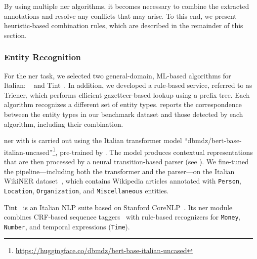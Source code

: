
By using multiple \ac{ner} algorithms, it becomes necessary to combine the extracted annotations and resolve any conflicts that may arise. To this end, we present heuristic-based combination rules, which are described in the remainder of this section. 







\subsubsection{Entity Recognition}          
For the \ac{ner} task, we selected two general-domain, ML-based algorithms for Italian: \spacy~\cite{honnibal2020spacy} and Tint~\cite{2018tint2}. 
In addition, we developed a rule-based service, referred to as Trie\ac{ner}, which performs efficient gazetteer-based lookup using a prefix tree.  
Each algorithm recognizes a different set of entity types.  reports the correspondence between the entity types in our benchmark dataset and those detected by each algorithm, including their combination.  

\ac{ner} with \spacy is carried out using the Italian transformer model ``dbmdz/bert-base-italian-uncased''\footnote{\url{https://huggingface.co/dbmdz/bert-base-italian-uncased}}, pre-trained by \textcite{stefan_schweter_2020_4263142}.  
The model produces contextual representations that are then processed by a neural transition-based parser (see ).  
We fine-tuned the \spacy pipeline---including both the transformer and the parser---on the Italian WikiNER dataset~\cite{NOTHMAN2013151}, which contains Wikipedia articles annotated with \texttt{Person}, \texttt{Location}, \texttt{Organization}, and \texttt{Miscellaneous} entities.

Tint~\cite{2018tint2} is an Italian NLP suite based on Stanford CoreNLP~\cite{manning-EtAl:2014:P14-5}.  
Its \ac{ner} module combines CRF-based sequence taggers~\cite{Lafferty2001} with rule-based recognizers for \texttt{Money}, \texttt{Number}, and temporal expressions (\texttt{Time}).

